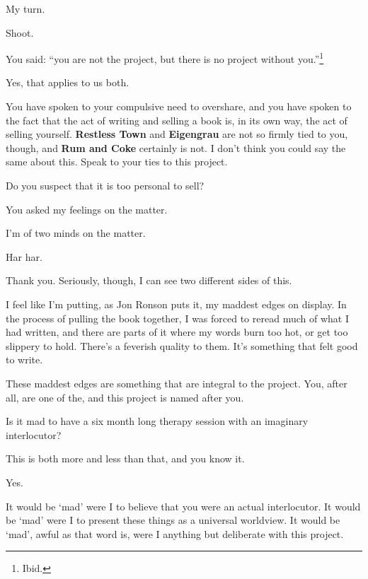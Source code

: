 \label{ally:32}
\begin{paracol}{2}
  \begin{leftcolumn}
\begin{ally}
My turn.
\end{ally}
Shoot.

\begin{ally}
You said: ``you are not the project, but there is no project without you.''\footnote{Ibid.}
\end{ally}
Yes, that applies to us both.

\begin{ally}
You have spoken to your compulsive need to overshare, and you have spoken to the fact that the act of writing and selling a book is, in its own way, the act of selling yourself. \textbf{Restless Town} and \textbf{Eigengrau} are not so firmly tied to you, though, and \textbf{Rum and Coke} certainly is not. I don't think you could say the same about this. Speak to your ties to this project.
\end{ally}
Do you suspect that it is too personal to sell?

\begin{ally}
You asked my feelings on the matter.
\end{ally}
I'm of two minds on the matter.

\begin{ally}
Har har.
\end{ally}
Thank you. Seriously, though, I can see two different sides of this.

I feel like I'm putting, as Jon Ronson puts it, my maddest edges on display. In the process of pulling the book together, I was forced to reread much of what I had written, and there are parts of it where my words burn too hot, or get too slippery to hold. There's a feverish quality to them. It's something that felt good to write.

These maddest edges are something that are integral to the project. You, after all, are one of the, and this project is named after you.

\begin{ally}
Is it mad to have a six month long therapy session with an imaginary interlocutor?
\end{ally}
This is both more and less than that, and you know it.

\begin{ally}
Yes.
\end{ally}
It would be `mad' were I to believe that you were an actual interlocutor. It would be `mad' were I to present these things as a universal worldview. It would be `mad', awful as that word is, were I anything but deliberate with this project.


\end{leftcolumn}
\end{paracol}
